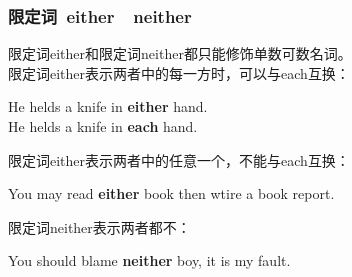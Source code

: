 \documentclass[UTF8]{ctexart}
\newcommand{\littf}[1]{{\hspace{3pt}\ttfamily #1}}
\begin{document}
\newpage

\subsubsection{限定词~\littf{either}~~\littf{neither}}
    限定词\littf{either}和限定词\littf{neither}都只能修饰单数可数名词。\\[3mm]
    限定词\littf{either}表示两者中的每一方时，可以与\littf{each}互换：
    \begin{center}
        \large\ttfamily
        He helds a knife in \textbf{either} hand.\\[2mm]
        He helds a knife in \textbf{each} hand.\\[4mm]
    \end{center}
    限定词\littf{either}表示两者中的任意一个，不能与\littf{each}互换：
    \begin{center}
        \large\ttfamily
        You may read \textbf{either} book then wtire a book report.\\[4mm]
    \end{center}
    限定词\littf{neither}表示两者都不：
    \begin{center}
        \large\ttfamily
        You should blame \textbf{neither} boy, it is my fault.
    \end{center}
\end{document}
